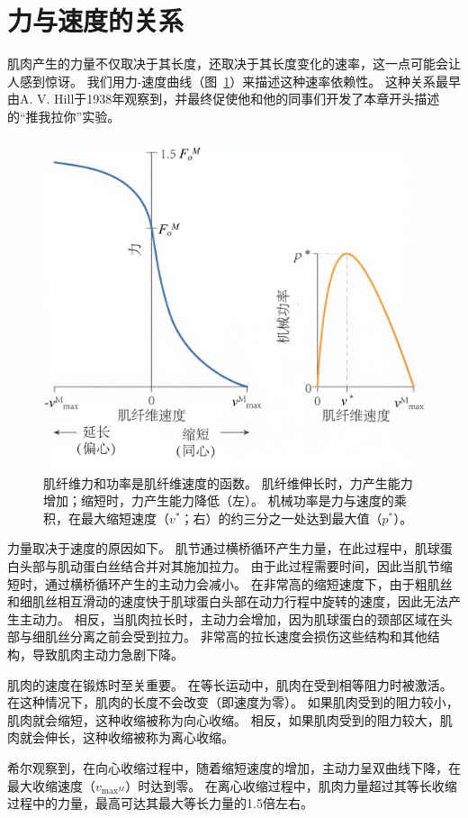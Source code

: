 \section{力与速度的关系}

肌肉产生的力量不仅取决于其长度，还取决于其长度变化的速率，这一点可能会让人感到惊讶。
我们用力-速度曲线（图~\ref{fig:4_9}）来描述这种速率依赖性。
这种关系最早由A. V. Hill于1938年观察到，并最终促使他和他的同事们开发了本章开头描述的“推我拉你”实验。

\begin{figure}[!htb]
	\centering
	\includegraphics[width=0.7\linewidth]{chap4/4_9}
	\caption{肌纤维力和功率是肌纤维速度的函数。
		肌纤维伸长时，力产生能力增加；缩短时，力产生能力降低（左）。
		机械功率是力与速度的乘积，在最大缩短速度（$v^*$；右）的约三分之一处达到最大值（$p^*$）。 \label{fig:4_9}}
\end{figure}

力量取决于速度的原因如下。
肌节通过横桥循环产生力量，在此过程中，肌球蛋白头部与肌动蛋白丝结合并对其施加拉力。
由于此过程需要时间，因此当肌节缩短时，通过横桥循环产生的主动力会减小。
在非常高的缩短速度下，由于粗肌丝和细肌丝相互滑动的速度快于肌球蛋白头部在动力行程中旋转的速度，因此无法产生主动力。
相反，当肌肉拉长时，主动力会增加，因为肌球蛋白的颈部区域在头部与细肌丝分离之前会受到拉力。
非常高的拉长速度会损伤这些结构和其他结构，导致肌肉主动力急剧下降。


肌肉的速度在锻炼时至关重要。
在等长运动中，肌肉在受到相等阻力时被激活。
在这种情况下，肌肉的长度不会改变（即速度为零）。
如果肌肉受到的阻力较小，肌肉就会缩短，这种收缩被称为向心收缩。
相反，如果肌肉受到的阻力较大，肌肉就会伸长，这种收缩被称为离心收缩。


希尔观察到，在向心收缩过程中，随着缩短速度的增加，主动力呈双曲线下降，在最大收缩速度（$v_{\text{max}^M}$）时达到零。
在离心收缩过程中，肌肉力量超过其等长收缩过程中的力量，最高可达其最大等长力量的1.5倍左右。


